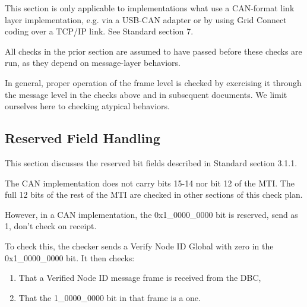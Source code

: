 This section is only applicable to implementations what use a CAN-format link layer
implementation, e.g. via a USB-CAN adapter or by using Grid Connect coding
over a TCP/IP link. See Standard section 7.

All checks in the prior section are assumed to have passed before these
checks are run, as they depend on message-layer behaviors.

In general, proper operation of the frame level is checked by 
exercising it through the message level in the checks above and in subsequent 
documents.  We limit ourselves here to checking atypical behaviors.

\subsection{Reserved Field Handling}

This section discusses the reserved bit fields described in Standard section 3.1.1.

The CAN implementation does not carry bits 15-14 nor bit 12 of the MTI. 
The full 12 bits of the rest of the MTI are checked in other sections of this check plan.

However, in a CAN implementation, the 0x1\_0000\_0000 bit is reserved, send as 1, 
don't check on receipt.

To check this, the checker sends a Verify Node ID Global with zero in the 0x1\_0000\_0000
bit. It then checks:

\begin{enumerate}
\item That a Verified Node ID message frame is received from the DBC,
\item That the 1\_0000\_0000 bit in that frame is a one.
\end{enumerate}



  
